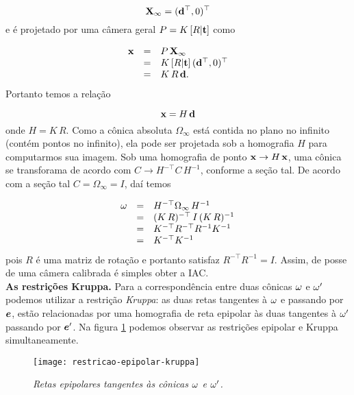 \begin{equation*}
\mathbf{X}_\infty=({\bf d}^\top,0)^\top
\end{equation*} 
e é projetado por uma câmera geral $P=K\,[R|{\bf t}]$ como

\begin{equation*}
\begin{array}{rcl}
\mathbf{x}&=&P\,\mathbf{X}_\infty\\
&=&K\,[R|{\bf t}]\,({\bf d}^\top,0)^\top\\
&=&K\,R\,{\bf d}.
\end{array}
\end{equation*}
Portanto temos a relação

\begin{equation*}
\mathbf{x}=H\,{\bf d}
\end{equation*}
onde $H=K\,R$. Como a cônica absoluta $\Omega_\infty$ está contida no plano no infinito (contém pontos no infinito), ela pode ser projetada sob a homografia $H$ para computarmos sua imagem.
Sob uma homografia de ponto $\mathbf{x}\rightarrow H\,\mathbf{x}$, uma cônica se transforama de acordo com $C\rightarrow H^{-\top} C\,H^{-1}$, conforme a seção tal. De acordo com a seção tal $C=\Omega_\infty =I$, daí temos

\begin{equation*}
\begin{array}{rcl}
{\bf \omega}&=&H^{-\top}\Omega_\infty\,H^{-1}\\
&=&(K\,R)^{-\top}\,I\,(K\,R)^{-1}\\
&=&K^{-\top}R^{-\top}R^{-1}K^{-1}\\
&=&K^{-\top}K^{-1}
\end{array}
\end{equation*}
pois $R$ é uma matriz de rotação e portanto satisfaz $R^{-\top}R^{-1}=I$. Assim, de posse de uma câmera calibrada é simples obter a IAC.\\

{\bf As restrições Kruppa.} Para a correspondência entre duas cônicas ${\bf \omega}$ e ${\bf \omega'}$ podemos utilizar a restrição \textit{Kruppa}: as duas retas tangentes à ${\bf \omega}$ e passando por $\boldsymbol{e}$, estão relacionadas por uma homografia de reta epipolar às duas tangentes à ${\bf \omega'}$ passando por $\boldsymbol{e}'$. Na figura \ref{epipolar-kruppa} podemos observar as restrições epipolar e Kruppa simultaneamente.

\begin{figure}[!htb]
\centering
\texttt{[image: restricao-epipolar-kruppa]}
\caption{\textit{Retas epipolares tangentes às cônicas ${\bf \omega}$ e ${\bf \omega'}$.}}
\label{epipolar-kruppa}
\end{figure}

